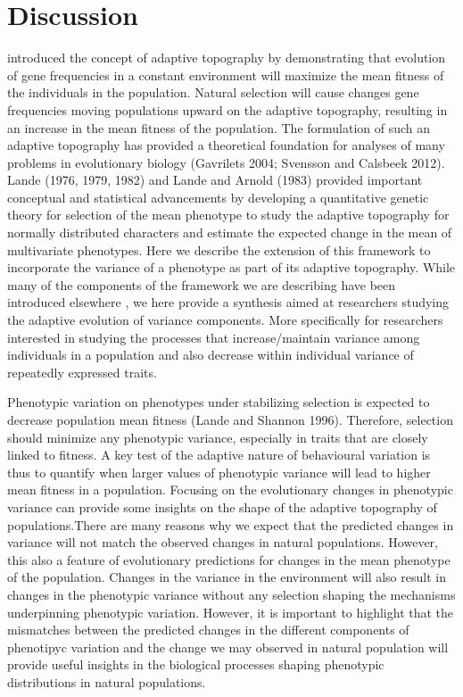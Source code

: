 \documentclass{article}
\begin{document}
\section{Discussion}
\cite{Wright1931} introduced the concept of adaptive topography by demonstrating that evolution of gene frequencies in a constant environment will maximize the mean fitness of the individuals in the population. Natural selection will cause changes gene frequencies moving populations upward on the adaptive topography, resulting in an increase in the mean fitness of the population. The formulation of such an adaptive topography has provided a theoretical foundation for analyses of many problems in evolutionary biology (Gavrilets 2004; Svensson and Calsbeek 2012). Lande (1976, 1979, 1982) and Lande and Arnold (1983) provided important conceptual and statistical advancements by developing a quantitative genetic theory for selection of the mean phenotype to study the adaptive topography for normally distributed characters and estimate the expected change in the mean of multivariate phenotypes. Here we describe the extension of this framework to incorporate the variance of a phenotype as part of its adaptive topography. While many of the components of the framework we are describing have been introduced elsewhere \citep{Hill2004,Hill2010, Lande1979, Lande1983}, we here provide a synthesis aimed at researchers studying the adaptive evolution of variance components. More specifically for researchers interested in studying the processes that increase/maintain variance among individuals in a population and also decrease within individual variance of repeatedly expressed traits.

Phenotypic variation on phenotypes under stabilizing selection is expected to decrease population mean fitness (Lande and Shannon 1996). Therefore, selection should minimize any phenotypic variance, especially in traits that are closely linked to fitness. A key test of the adaptive nature of behavioural variation is thus to quantify when larger values of phenotypic variance will lead to higher mean fitness in a population. Focusing on the evolutionary changes in phenotypic variance can provide some insights on the shape of the adaptive topography of populations.There are many reasons why we expect that the predicted changes in variance will not match the observed changes in natural populations. However, this also a feature of evolutionary predictions for changes in the mean phenotype of the population. Changes in the variance in the environment will also result in changes in the phenotypic variance without any selection shaping the mechanisms underpinning phenotypic variation. However, it is important to highlight that the mismatches between the predicted changes in the different components of phenotipyc variation and the change we may observed in natural population will provide useful insights in the biological processes shaping phenotypic distributions in natural populations. 
\end{document}
